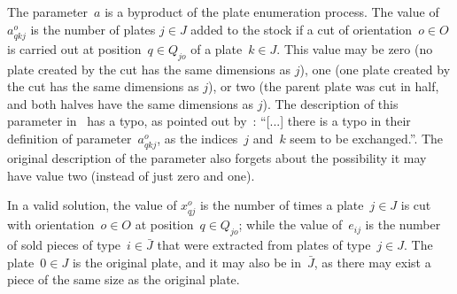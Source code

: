 \documentclass[ppgc,prop-tese,english,formais,babel]{iiufrgs}
\makeatletter
\newcommand{\specialcell}[1]{\ifmeasuring@#1\else\omit$\displaystyle#1$\ignorespaces\fi}
\makeatother
\begin{document}
The parameter~\(a\) is a byproduct of the plate enumeration process.
The value of \(a^o_{qkj}\) is the number of plates \(j \in J\) added to the stock if a cut of orientation~\(o \in O\) is carried out at position~\(q \in Q_{jo}\) of a plate~\(k \in J\).
This value may be zero (no plate created by the cut has the same dimensions as \(j\)), one (one plate created by the cut has the same dimensions as \(j\)), or two (the parent plate was cut in half, and both halves have the same dimensions as \(j\)).
The description of this parameter in~\citet{furini:2016} has a typo, as pointed out by~\citet{martin:2020}:
``[...] there is a typo in their definition of parameter~\(a^o_{qkj}\), as the indices~\(j\) and~\(k\) seem to be exchanged.''.
The original description of the parameter also forgets about the possibility it may have value two (instead of just zero and one).

In a valid solution, the value of \(x^o_{qj}\) is the number of times a plate~\(j \in J\) is cut with orientation~\(o \in O\) at position~\(q \in Q_{jo}\); while the value of~\(e_{ij}\) is the number of sold pieces of type~\(i \in \bar{J}\) that were extracted from plates of type~\(j \in J\).
The plate~\(0 \in J\) is the original plate, and it may also be in~\(\bar{J}\), as there may exist a piece of the same size as the original plate.

\end{document}
